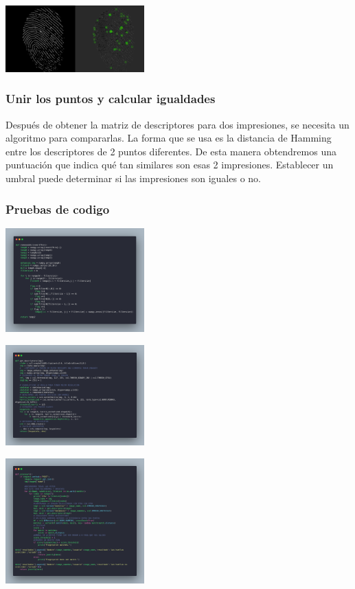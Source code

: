 \documentclass[preprint,12pt]{elsarticle}
\begin{document}
\begin{multicols}{2}
{\includegraphics[width=0.4\textwidth]{./IMAGENES/harris}\par}

\subsubsection{Unir los puntos y calcular igualdades}
Después de obtener la matriz de descriptores para dos impresiones, se necesita un algoritmo para compararlas. La forma que se usa es la distancia de Hamming entre los descriptores de 2 puntos diferentes. De esta manera obtendremos una puntuación que indica qué tan similares son esas 2 impresiones. Establecer un umbral puede determinar si las impresiones son iguales o no.
	\subsubsection{Pruebas de codigo}
	
{\includegraphics[width=0.4\textwidth]{./IMAGENES/removedot}\par}
{\includegraphics[width=0.4\textwidth]{./IMAGENES/descriptor}\par}
{\includegraphics[width=0.4\textwidth]{./IMAGENES/procesar}\par}



\end{multicols}
\end{document}
